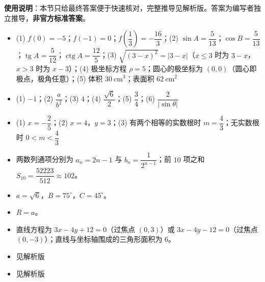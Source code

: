 
\begin{gknotice}
\textbf{使用说明}：本节只给最终答案便于快速核对，完整推导见解析版。答案为编写者独立推导，\textbf{非官方标准答案}。
\end{gknotice}

\begin{itemize}[leftmargin=2.6em]
  \item[\textbf{1.}] (1) $f(0)=-5$；$f(-1)=0$；$f\left(\dfrac13\right)=-\dfrac{16}{3}$；(2) $\sin A=\dfrac5{13}$；$\cos B=\dfrac5{13}$；$\operatorname{tg}A=\dfrac5{12}$；$\operatorname{ctg}A=\dfrac{12}{5}$；(3) $\sqrt{(3-x)^2}=\left|3-x\right|$（$x\le 3$ 时为 $3-x$，$x>3$ 时为 $x-3$）；(4) 极坐标方程 $\rho=5$；圆心的极坐标为 $(0,0)$（圆心即极点，极角任意）；(5) 体积 $30\ \mathrm{cm^3}$；表面积 $62\ \mathrm{cm^2}$
  \item[\textbf{2.}] (1) $-1$；(2) $\dfrac{a}{b^2}$；(3) $4$；(4) $\dfrac{\sqrt6}{2}$；(5) $\dfrac34$；(6) $\dfrac{2}{\left|\sin\theta\right|}$
  \item[\textbf{3.}] (1) $x=-\dfrac25$；(2) $x=4$，$y=3$；(3) 有两个相等的实数根时 $m=\dfrac43$；无实数根时 $0<m<\dfrac43$
  \item[\textbf{4.}] 两数列通项分别为 $a_n=2n-1$ 与 $b_n=\dfrac{1}{2^{n-1}}$；前 $10$ 项之和 $S_{10}=\dfrac{52223}{512}\approx 102$。
  \item[\textbf{5.}] $a=\sqrt6$，$B=75^\circ$，$C=45^\circ$。
  \item[\textbf{6.}] $R=a$。
  \item[\textbf{7.}] 直线方程为 $3x-4y+12=0$（过焦点 $(0,3)$）或 $3x-4y-12=0$（过焦点 $(0,-3)$）；直线与坐标轴围成的三角形面积为 $6$。
  \item[\textbf{8.}] 见解析版
  \item[\textbf{9.}] 见解析版
\end{itemize}
